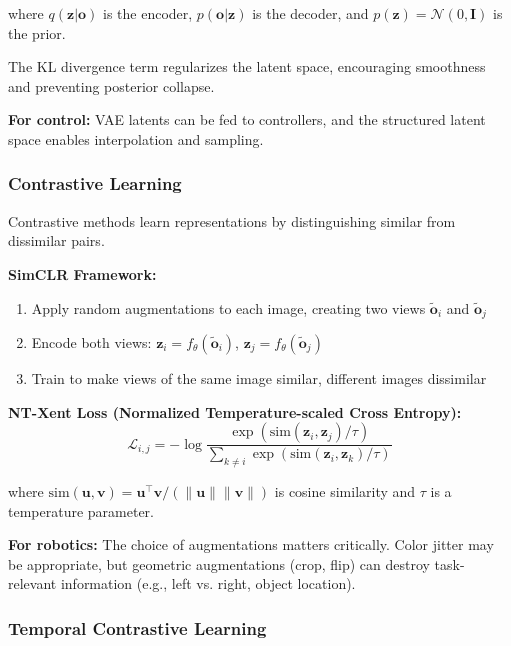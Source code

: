 where $q(\mathbf{z}|\mathbf{o})$ is the encoder, $p(\mathbf{o}|\mathbf{z})$ is the decoder, and $p(\mathbf{z}) = \mathcal{N}(0, \mathbf{I})$ is the prior.

The KL divergence term regularizes the latent space, encouraging smoothness and preventing posterior collapse.

\textbf{For control:} VAE latents can be fed to controllers, and the structured latent space enables interpolation and sampling.

\subsubsection{Contrastive Learning}

Contrastive methods learn representations by distinguishing similar from dissimilar pairs.

\textbf{SimCLR Framework:}
\begin{enumerate}
    \item Apply random augmentations to each image, creating two views $\tilde{\mathbf{o}}_i$ and $\tilde{\mathbf{o}}_j$
    \item Encode both views: $\mathbf{z}_i = f_\theta(\tilde{\mathbf{o}}_i)$, $\mathbf{z}_j = f_\theta(\tilde{\mathbf{o}}_j)$
    \item Train to make views of the same image similar, different images dissimilar
\end{enumerate}

\textbf{NT-Xent Loss (Normalized Temperature-scaled Cross Entropy):}
\begin{equation}
\mathcal{L}_{i,j} = -\log \frac{\exp(\text{sim}(\mathbf{z}_i, \mathbf{z}_j) / \tau)}{\sum_{k \neq i} \exp(\text{sim}(\mathbf{z}_i, \mathbf{z}_k) / \tau)}
\label{eq:ntxent}
\end{equation}

where $\text{sim}(\mathbf{u}, \mathbf{v}) = \mathbf{u}^\top \mathbf{v} / (\|\mathbf{u}\| \|\mathbf{v}\|)$ is cosine similarity and $\tau$ is a temperature parameter.

\textbf{For robotics:} The choice of augmentations matters critically. Color jitter may be appropriate, but geometric augmentations (crop, flip) can destroy task-relevant information (e.g., left vs. right, object location).

\subsubsection{Temporal Contrastive Learning}

